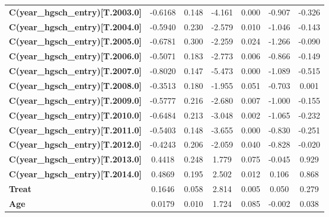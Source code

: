 \begin{center}
\begin{tabular}{lcccccc}
\textbf{C(year\_hgsch\_entry)[T.2003.0]} &      -0.6168  &        0.148     &    -4.161  &         0.000        &       -0.907    &       -0.326     \\
\textbf{C(year\_hgsch\_entry)[T.2004.0]} &      -0.5940  &        0.230     &    -2.579  &         0.010        &       -1.046    &       -0.143     \\
\textbf{C(year\_hgsch\_entry)[T.2005.0]} &      -0.6781  &        0.300     &    -2.259  &         0.024        &       -1.266    &       -0.090     \\
\textbf{C(year\_hgsch\_entry)[T.2006.0]} &      -0.5071  &        0.183     &    -2.773  &         0.006        &       -0.866    &       -0.149     \\
\textbf{C(year\_hgsch\_entry)[T.2007.0]} &      -0.8020  &        0.147     &    -5.473  &         0.000        &       -1.089    &       -0.515     \\
\textbf{C(year\_hgsch\_entry)[T.2008.0]} &      -0.3513  &        0.180     &    -1.955  &         0.051        &       -0.703    &        0.001     \\
\textbf{C(year\_hgsch\_entry)[T.2009.0]} &      -0.5777  &        0.216     &    -2.680  &         0.007        &       -1.000    &       -0.155     \\
\textbf{C(year\_hgsch\_entry)[T.2010.0]} &      -0.6484  &        0.213     &    -3.048  &         0.002        &       -1.065    &       -0.232     \\
\textbf{C(year\_hgsch\_entry)[T.2011.0]} &      -0.5403  &        0.148     &    -3.655  &         0.000        &       -0.830    &       -0.251     \\
\textbf{C(year\_hgsch\_entry)[T.2012.0]} &      -0.4243  &        0.206     &    -2.059  &         0.040        &       -0.828    &       -0.020     \\
\textbf{C(year\_hgsch\_entry)[T.2013.0]} &       0.4418  &        0.248     &     1.779  &         0.075        &       -0.045    &        0.929     \\
\textbf{C(year\_hgsch\_entry)[T.2014.0]} &       0.4869  &        0.195     &     2.502  &         0.012        &        0.106    &        0.868     \\
\textbf{Treat}                           &       0.1646  &        0.058     &     2.814  &         0.005        &        0.050    &        0.279     \\
\textbf{Age}                             &       0.0179  &        0.010     &     1.724  &         0.085        &       -0.002    &        0.038     \\

\end{tabular}
\end{center}
